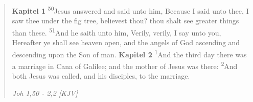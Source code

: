 \begin{quote}
\textbf{Kapitel 1}
\textsuperscript{50}Jesus answered and said unto him, Because I said unto thee, I saw thee under the fig tree, believest thou? thou shalt see greater things than these.
\textsuperscript{51}And he saith unto him, Verily, verily, I say unto you, Hereafter ye shall see heaven open, and the angels of God ascending and descending upon the Son of man.
\textbf{Kapitel 2}
\textsuperscript{1}And the third day there was a marriage in Cana of Galilee; and the mother of Jesus was there:
\textsuperscript{2}And both Jesus was called, and his disciples, to the marriage.
\begin{flushright}
\emph{Joh 1,50 - 2,2 [KJV]}
\end{flushright}
\end{quote}